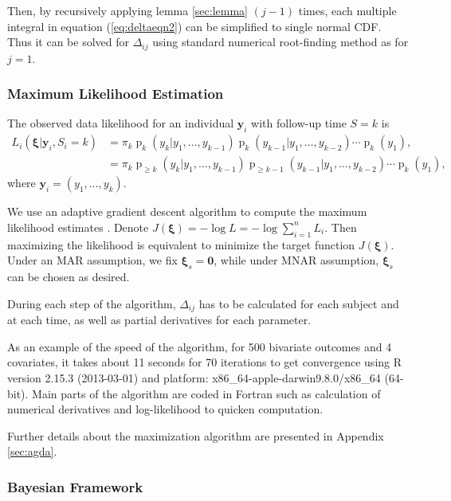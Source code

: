 \documentclass[12pt]{article}
\DeclareMathOperator{\pr}{p}
\begin{document}
\begin{itemize}
  Then, by recursively applying lemma \ref{sec:lemma} $(j-1)$ times,
  each multiple integral in equation (\ref{eq:deltaeqn2}) can be
  simplified to single normal CDF. Thus it can be solved for
  $\Delta_{ij}$ using standard numerical root-finding method as for $j
  = 1$.

\end{itemize}

\subsubsection{Maximum Likelihood Estimation}
\label{sec:mle}

The observed data likelihood for an individual $\bm y_i$ with
follow-up time $S = k$ is
\begin{align} \label{eq:ll} L_i(\bm \xi| \bm y_i, S_{i} = k) & =
  \pi_k\pr_k (y_k | y_1, \ldots, y_{k-1})
  \pr_k (y_{k-1}|y_1, \ldots, y_{k-2}) \cdots \pr_{k} (y_1), \\
  & = \pi_k \pr_{\geq k} (y_k | y_1, \ldots, y_{k-1}) \pr_{\geq k-1}
  (y_{k-1}|y_1, \ldots, y_{k-2}) \cdots \pr_{k} (y_1), \nonumber
\end{align}
where $\bm y_i = (y_1, \ldots, y_k)$.

We use an adaptive gradient descent algorithm to compute the maximum
likelihood estimates \citep{ried1993}. Denote $J(\bm \xi) = - \log L =
- \log \sum_{i = 1}^n L_i$.  Then maximizing the likelihood is
equivalent to minimize the target function $J(\bm \xi)$. Under an MAR
assumption, we fix $\bm \xi_s = \bm 0$, while under MNAR assumption,
$\bm \xi_s $ can be chosen as desired.

During each step of the algorithm, $\Delta_{ij}$ has to be calculated
for each subject and at each time, as well as partial derivatives for
each parameter.

As an example of the speed of the algorithm, for 500 bivariate
outcomes and 4 covariates, it takes about 11 seconds for 70 iterations
to get convergence using R version 2.15.3 (2013-03-01) \citep{R} and
platform: x86\_64-apple-darwin9.8.0/x86\_64 (64-bit). Main parts of
the algorithm are coded in Fortran such as calculation of numerical
derivatives and log-likelihood to quicken computation.

Further details about the maximization algorithm are presented in
Appendix \ref{sec:agda}.

\subsubsection{Bayesian Framework}
\label{sec:bayesian}
\end{document}
